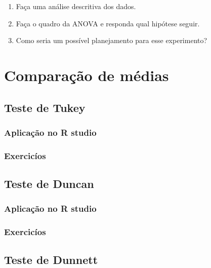 \documentclass[
]{book}
\begin{document}
\begin{enumerate}
\def\labelenumi{\alph{enumi})}
\item
  Faça uma análise descritiva dos dados.
\item
  Faça o quadro da ANOVA e responda qual hipótese seguir.
\item
  Como seria um possível planejamento para esse experimento?
\end{enumerate}

\hypertarget{comparauxe7uxe3o-de-muxe9dias}{%
\chapter{Comparação de médias}\label{comparauxe7uxe3o-de-muxe9dias}}

\hypertarget{teste-de-tukey}{%
\section{Teste de Tukey}\label{teste-de-tukey}}

\hypertarget{aplicauxe7uxe3o-no-r-studio-3}{%
\subsection{Aplicação no R studio}\label{aplicauxe7uxe3o-no-r-studio-3}}

\hypertarget{exercicuxedos-3}{%
\subsection{Exercicíos}\label{exercicuxedos-3}}

\hypertarget{teste-de-duncan}{%
\section{Teste de Duncan}\label{teste-de-duncan}}

\hypertarget{aplicauxe7uxe3o-no-r-studio-4}{%
\subsection{Aplicação no R studio}\label{aplicauxe7uxe3o-no-r-studio-4}}

\hypertarget{exercicuxedos-4}{%
\subsection{Exercicíos}\label{exercicuxedos-4}}

\hypertarget{teste-de-dunnett}{%
\section{Teste de Dunnett}\label{teste-de-dunnett}}
\end{document}
